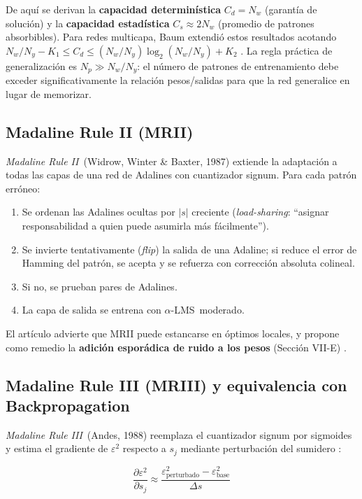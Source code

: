 \documentclass[11pt,a4paper]{article}
\newcommand{\aLMS}{$\alpha$-LMS}
\newcommand{\mrii}{\textit{Madaline Rule II}}
\newcommand{\mriii}{\textit{Madaline Rule III}}
\begin{document}
De aquí se derivan la \textbf{capacidad determinística} $C_d = N_w$ (garantía de solución) y la
\textbf{capacidad estadística} $C_s \approx 2N_w$ (promedio de patrones absorbibles). Para redes
multicapa, Baum extendió estos resultados acotando $N_w/N_y - K_1 \leq C_d \leq
(N_w/N_y)\log_2(N_w/N_y) + K_2$ \cite{widrow1990}. La regla práctica de generalización es
$N_p \gg N_w/N_y$: el número de patrones de entrenamiento debe exceder significativamente la
relación pesos/salidas para que la red generalice en lugar de memorizar.

\subsection{Madaline Rule II (MRII)}

\mrii~(Widrow, Winter \& Baxter, 1987) \cite{widrow1990} extiende la adaptación a todas las capas
de una red de Adalines con cuantizador signum. Para cada patrón erróneo:

\begin{enumerate}[leftmargin=*]
    \item Se ordenan las Adalines ocultas por $|s|$ creciente (\textit{load-sharing}: ``asignar
    responsabilidad a quien puede asumirla más fácilmente'').
    \item Se invierte tentativamente (\textit{flip}) la salida de una Adaline; si reduce el error
    de Hamming del patrón, se acepta y se refuerza con corrección absoluta colineal.
    \item Si no, se prueban pares de Adalines.
    \item La capa de salida se entrena con \aLMS~moderado.
\end{enumerate}

El artículo advierte que MRII puede estancarse en óptimos locales, y propone como remedio la
\textbf{adición esporádica de ruido a los pesos} (Sección VII-E) \cite{widrow1990}.

\subsection{Madaline Rule III (MRIII) y equivalencia con Backpropagation}

\mriii~(Andes, 1988) reemplaza el cuantizador signum por sigmoides y estima el gradiente de
$\varepsilon^2$ respecto a $s_j$ mediante perturbación del sumidero \cite{widrow1990}:

\begin{equation}
\frac{\partial \varepsilon^2}{\partial s_j} \approx
\frac{\varepsilon^2_{\text{perturbado}} - \varepsilon^2_{\text{base}}}{\Delta s}
\label{eq:mriii}
\end{equation}
\end{document}

